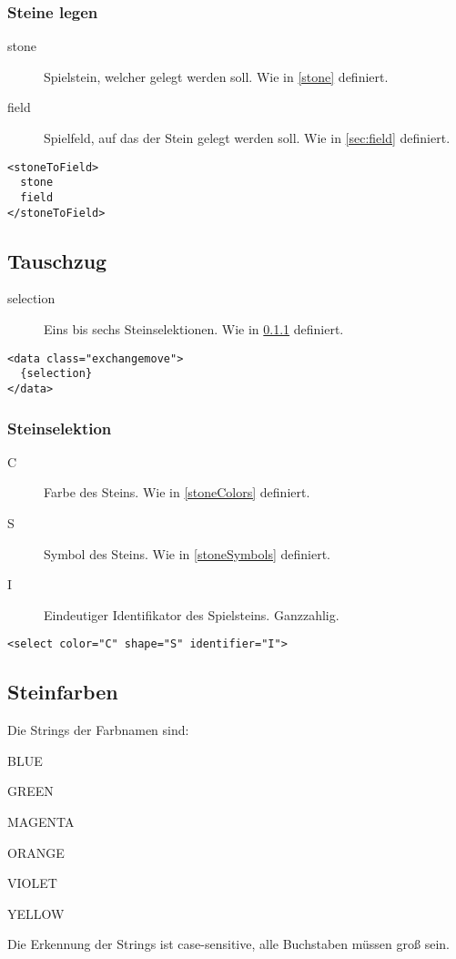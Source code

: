 \documentclass[12pt,a4paper, ngerman, oneside]{scrartcl}
\begin{document}
\subsubsection{Steine legen}
\label{stoneToField}
\begin{description}
\item[stone] Spielstein, welcher gelegt werden soll. Wie in \ref{stone} definiert.
\item[field] Spielfeld, auf das der Stein gelegt werden soll. Wie in \ref{sec:field} definiert.
\end{description}
\begin{verbatim}
<stoneToField>
  stone
  field
</stoneToField>
\end{verbatim}

\subsection{Tauschzug}
\label{changeMove}
\begin{description}
\item[selection] Eins bis sechs Steinselektionen. Wie in \ref{sec:stoneSelection} definiert.
\end{description}
\begin{verbatim}
<data class="exchangemove">
  {selection}
</data>
\end{verbatim}

\subsubsection{Steinselektion}
\label{sec:stoneSelection}
\begin{description}
\item[C] Farbe des Steins. Wie in \ref{stoneColors} definiert.
\item[S] Symbol des Steins. Wie in \ref{stoneSymbols} definiert.
\item[I] Eindeutiger Identifikator des Spielsteins. Ganzzahlig.
\end{description}
\begin{verbatim}
<select color="C" shape="S" identifier="I">
\end{verbatim}

\subsection{\label{stoneColors}Steinfarben}
Die Strings der Farbnamen sind:
\begin{compactenum}
\item BLUE
\item GREEN
\item MAGENTA
\item ORANGE
\item VIOLET
\item YELLOW
\end{compactenum}
Die Erkennung der Strings ist case-sensitive, alle Buchstaben müssen groß
sein.
\end{document}
